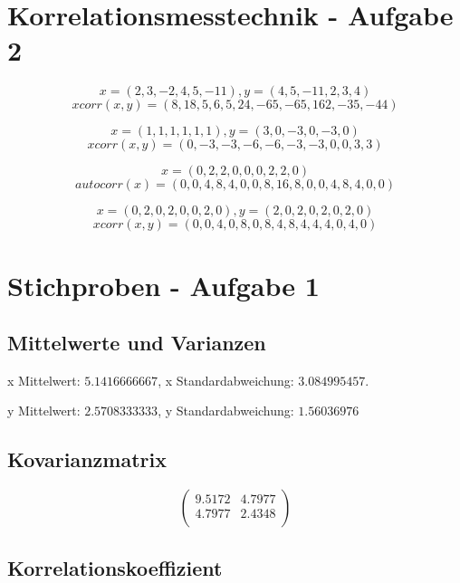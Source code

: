 \documentclass[10pt,a4paper]{article}
\begin{document}
\section*{Korrelationsmesstechnik - Aufgabe 2}

\[ x = (2,3,-2,4,5,-11), y = (4,5,-11,2,3,4) \]
\[ xcorr(x, y) = (8,18,5,6,5,24,-65,-65,162,-35,-44)\]

\[ x = (1,1,1,1,1,1), y = (3,0,-3,0,-3,0) \]
\[ xcorr(x, y) = (0, -3, -3, -6, -6, -3, -3, 0, 0, 3, 3)\]

\[ x = (0, 2, 2, 0, 0, 0, 2, 2, 0) \]
\[ autocorr(x) = (0,0,4,8,4,0,0,8,16,8,0,0,4,8,4,0,0) \]

\[ x = (0, 2, 0, 2, 0, 0, 2, 0), y = (2, 0, 2, 0, 2, 0, 2, 0) \]
\[ xcorr(x, y) = (0,0,4,0,8,0,8,4,8,4,4,4,0,4,0) \]

\section*{Stichproben - Aufgabe 1}

\subsection*{Mittelwerte und Varianzen}

x Mittelwert: $5.1416666667$, x Standardabweichung: $3.084995457$.

y Mittelwert: $2.5708333333$, y Standardabweichung: $1.56036976$

\subsection*{Kovarianzmatrix}

\[
\begin{pmatrix}
9.5172 & 4.7977 \\
4.7977 & 2.4348 \\
\end{pmatrix}
\]

\subsection*{Korrelationskoeffizient}
\end{document}
